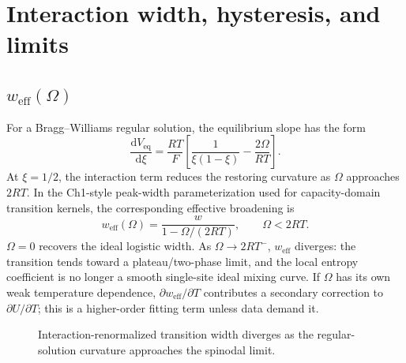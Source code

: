 \documentclass[11pt,a4paper]{article}
\newcommand{\dd}{\mathrm{d}}
\newcommand{\eq}{\mathrm{eq}}
\newcommand{\eff}{\mathrm{eff}}
\begin{document}
\section{Interaction width, hysteresis, and limits}
\label{sec:limits}
\subsection{\texorpdfstring{$w_\eff(\Omega)$}{weff(Omega)}}
For a Bragg--Williams regular solution, the equilibrium slope has the form
\begin{equation}
\frac{\dd V_\eq}{\dd \xi}
=\frac{RT}{F}\left[
\frac{1}{\xi(1-\xi)}-\frac{2\Omega}{RT}\right].
\label{eq:regular_slope}
\end{equation}
At $\xi=1/2$, the interaction term reduces the restoring curvature as
$\Omega$ approaches $2RT$. In the Ch1-style peak-width parameterization used for
capacity-domain transition kernels, the corresponding effective broadening is
\begin{equation}
\boxed{\;
w_\eff(\Omega)=\frac{w}{1-\Omega/(2RT)},\qquad \Omega<2RT.
\;}
\label{eq:weff}
\end{equation}
$\Omega=0$ recovers the ideal logistic width. As $\Omega\to2RT^-$, $w_\eff$ diverges:
the transition tends toward a plateau/two-phase limit, and the local entropy coefficient
is no longer a smooth single-site ideal mixing curve. If $\Omega$ has its own weak
temperature dependence, $\partial w_\eff/\partial T$ contributes a secondary correction
to $\partial U/\partial T$; this is a higher-order fitting term unless data demand it.

\begin{figure}[t]
\centering
{}
\caption{Interaction-renormalized transition width diverges as the regular-solution curvature approaches the spinodal limit.}
\label{fig:weff}
\end{figure}
\end{document}

